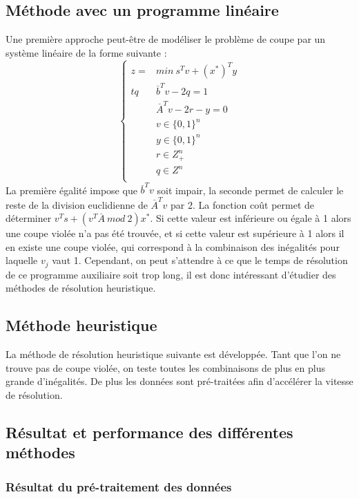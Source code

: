 \documentclass[12pt]{report}
\begin{document}
\subsection{Méthode avec un programme linéaire}
Une première approche peut-être de modéliser le problème de coupe par un système linéaire de la forme suivante :
$$
\left\{
    \begin{array}{ll}
        z=&min \ s^Tv+(x^\ast)^Ty \\
        tq &  \overset{\_}{b}^Tv-2q=1 \\
          & \overset{\_}{A}^Tv-2r-y=0 \\
          & v \in \{0,1\}^n \\
          & y \in \{0,1\}^n \\
          & r \in Z^n_+ \\
          & q \in Z^n \\
    \end{array}
\right.
$$
La première égalité impose que $\overset{\_}{b}^Tv$ soit impair, la seconde permet de calculer le reste de la division euclidienne de $\overset{\_}{A}^Tv$ par 2. La fonction coût permet de déterminer $v^Ts+(v^T\overset{\_}{A}\ mod\ 2)x^\ast$. Si cette valeur est inférieure ou égale à 1 alors une coupe violée n'a pas été trouvée, et si cette valeur est supérieure à 1 alors il en existe une coupe violée, qui correspond à la combinaison des inégalités pour laquelle $v_j$ vaut 1.
Cependant, on peut s'attendre à ce que le temps de résolution de ce programme auxiliaire soit trop long, il est donc intéressant d'étudier des méthodes de résolution heuristique.

\subsection{Méthode heuristique}
La méthode de résolution heuristique suivante est développée. Tant que l'on ne trouve pas de coupe violée, on teste toutes les combinaisons de plus en plus grande d'inégalités.
De plus les données sont pré-traitées afin d'accélérer la vitesse de résolution.

\subsection{Résultat et performance des différentes méthodes}

\subsubsection{Résultat du pré-traitement des données}
\end{document}
